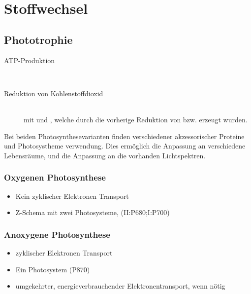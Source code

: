 \section{Stoffwechsel}
\label{sec:stoffwechsel}
\subsection{Phototrophie}
\begin{description}
	\item[ATP-Produktion]	\hfill \\
	\item[Reduktion von Kohlenstoffdioxid]	\hfill	\\
		mit  und ,
		welche durch die vorherige Reduktion von  bzw.  erzeugt wurden.
\end{description}
Bei beiden Photosynthesevarianten finden
verschiedener akzessorischer Proteine und Photosystheme verwendung.
Dies ermöglich die Anpassung an verschiedene Lebensräume,
und die Anpassung an die vorhanden Lichtspektren.

\subsubsection{Oxygenen Photosynthese}
\begin{itemize}
	\item Kein zyklischer Elektronen Transport
	\item Z-Schema mit zwei Photosysteme, (II:P680;I:P700)
\end{itemize}

\subsubsection{Anoxygene Photosynthese}
\begin{itemize}
	\item zyklischer Elektronen Transport
	\item Ein Photosystem (P870)
	\item umgekehrter, energieverbrauchender Elektronentransport,
		wenn  nötig
\end{itemize}

